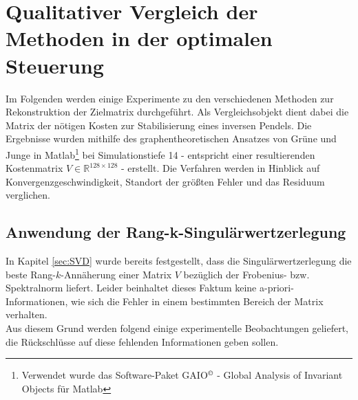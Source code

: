 \documentclass[12pt,a4paper,twoside]{article}
\begin{document}
\section{Qualitativer Vergleich der Methoden in der optimalen Steuerung}
Im Folgenden werden einige Experimente zu den verschiedenen Methoden zur Rekonstruktion der Zielmatrix durchgeführt. Als Vergleichsobjekt dient dabei die Matrix der nötigen Kosten zur Stabilisierung eines inversen Pendels. Die Ergebnisse wurden mithilfe des graphentheoretischen Ansatzes von Grüne und Junge \citep{Grune2005} in Matlab\footnote{Verwendet wurde das Software-Paket GAIO$^\copyright$	 - Global Analysis of Invariant Objects für Matlab} bei Simulationstiefe 14 - entspricht einer resultierenden Kostenmatrix $V\in\mathds{R}^{128\times 128}$ - erstellt. Die Verfahren werden in Hinblick auf Konvergenzgeschwindigkeit, Standort der größten Fehler und das Residuum verglichen.
\subsection{Anwendung der Rang-k-Singulärwertzerlegung}
In Kapitel \ref{sec:SVD} wurde bereits festgestellt, dass die Singulärwertzerlegung die beste Rang-$k$-Annäherung einer Matrix $V$ bezüglich der Frobenius- bzw. Spektralnorm liefert. Leider beinhaltet dieses Faktum keine a-priori-Informationen, wie sich die Fehler in einem bestimmten Bereich der Matrix verhalten. \\
Aus diesem Grund werden folgend einige experimentelle Beobachtungen geliefert, die Rückschlüsse auf diese fehlenden Informationen geben sollen. 
\end{document}
